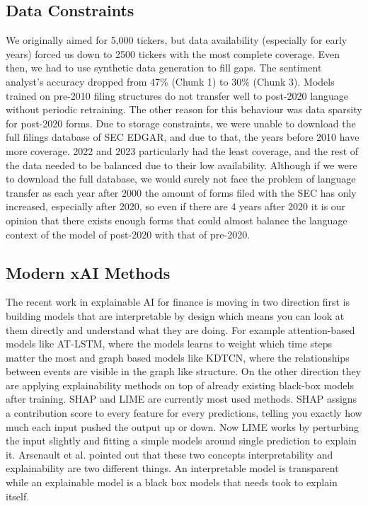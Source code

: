 \documentclass[conference]{IEEEtran}
\begin{document}
\subsection{Data Constraints}
We originally aimed for 5,000 tickers, but data availability (especially for early years) forced us down to 2500 tickers with the most complete coverage. Even then, we had to use synthetic data generation to fill gaps. The sentiment analyst's accuracy dropped from 47\% (Chunk 1) to 30\% (Chunk 3). Models trained on pre-2010 filing structures do not transfer well to post-2020 language without periodic retraining. The other reason for this behaviour was data sparsity for post-2020 forms. Due to storage constraints, we were unable to download the full filings database of SEC EDGAR\cite{SECedgarSite}, and due to that, the years before 2010 have more coverage. 2022 and 2023 particularly had the least coverage, and the rest of the data needed to be balanced due to their low availability. Although if we were to download the full database, we would surely not face the problem of language transfer as each year after 2000 the amount of forms filed with the SEC has only increased, especially after 2020, so even if there are 4 years after 2020 it is our opinion that there exists enough forms that could almost balance the language context of the model of post-2020 with that of pre-2020.
\subsection{Modern xAI Methods}
The recent work in explainable AI for finance is moving in two direction first is building models that are interpretable by design which means you can look at them directly and understand what they are doing. For example attention-based models like AT-LSTM\cite{ATLSTM}, where the models learns to weight which time steps matter the most and graph based models like KDTCN\cite{KDTCN}, where the relationships between events are visible in the graph like structure. On the other direction they are applying explainability methods on top of already existing black-box models after training. SHAP and LIME are currently most used methods. SHAP assigns a contribution score to every feature for every predictions, telling you exactly how much each input pushed the output up or down. Now LIME works by perturbing the input slightly and fitting a simple models around single prediction to explain it. Arsenault et al.\cite{12thPaper} pointed out that these two concepts interpretability and explainability are two different things. An interpretable model is transparent while an explainable model is a black box models that needs took to explain itself. 
\end{document}
